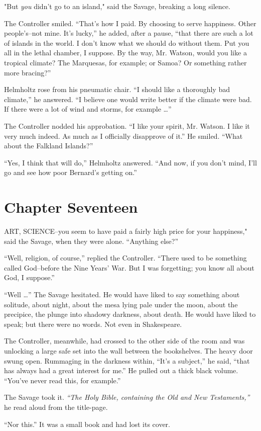 \documentclass[12pt]{report}
\newcommand{\mychapter}[2]{
\setcounter{chapter}{#1}
    \setcounter{section}{0}
    \chapter*{#2}
    \addcontentsline{toc}{chapter}{#2}
}
\begin{document}
"But \emph{you} didn't go to an island," said the Savage, breaking a
long silence.

The Controller smiled. ``That's how I paid. By choosing to serve
happiness. Other people's--not mine. It's lucky,'' he added, after a
pause, ``that there are such a lot of islands in the world. I don't know
what we should do without them. Put you all in the lethal chamber, I
suppose. By the way, Mr. Watson, would you like a tropical climate? The
Marquesas, for example; or Samoa? Or something rather more bracing?''

Helmholtz rose from his pneumatic chair. ``I should like a thoroughly
bad climate,'' he answered. ``I believe one would write better if the
climate were bad. If there were a lot of wind and storms, for example
\ldots{}''

The Controller nodded his approbation. ``I like your spirit, Mr. Watson.
I like it very much indeed. As much as I officially disapprove of it.''
He smiled. ``What about the Falkland Islands?''

``Yes, I think that will do,'' Helmholtz answered. ``And now, if you
don't mind, I'll go and see how poor Bernard's getting on.''

\mychapter{17}{Chapter Seventeen}
ART, SCIENCE--you seem to have paid a fairly high price for your
happiness," said the Savage, when they were alone. ``Anything else?''

``Well, religion, of course,'' replied the Controller. ``There used to
be something called God--before the Nine Years' War. But I was
forgetting; you know all about God, I suppose.''

``Well \ldots{}'' The Savage hesitated. He would have liked to say
something about solitude, about night, about the mesa lying pale under
the moon, about the precipice, the plunge into shadowy darkness, about
death. He would have liked to speak; but there were no words. Not even
in Shakespeare.

The Controller, meanwhile, had crossed to the other side of the room and
was unlocking a large safe set into the wall between the bookshelves.
The heavy door swung open. Rummaging in the darkness within, ``It's a
subject,'' he said, ``that has always had a great interest for me.'' He
pulled out a thick black volume. ``You've never read this, for
example.''

The Savage took it. \emph{``The Holy Bible, containing the Old and New
Testaments,''} he read aloud from the title-page.

``Nor this.'' It was a small book and had lost its cover.
\end{document}
